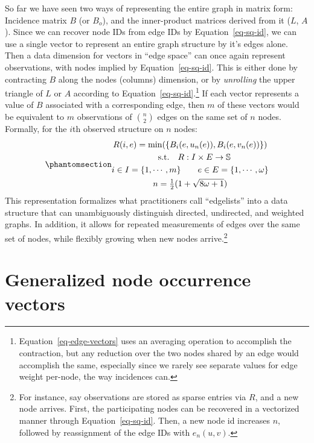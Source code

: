 \documentclass[%
	12pt,
		oneside,
		letterpaper
]{book}
\begin{document}
So far we have seen two ways of representing the entire graph in matrix
form: Incidence matrix \(B\) (or \(B_o\)), and the inner-product
matrices derived from it (\(L\), \(A\)). Since we can recover node IDs
from edge IDs by Equation~\ref{eq-sq-id}, we can use a single vector to
represent an entire graph structure by it's edges alone. Then a data
dimension for vectors in ``edge space'' can once again represent
observations, with nodes implied by Equation~\ref{eq-sq-id}. This is
either done by contracting \(B\) along the nodes (columns) dimension, or
by \emph{unrolling} the upper triangle of \(L\) or \(A\) according to
Equation~\ref{eq-sq-id}.\footnote{ Equation~\ref{eq-edge-vectors} uses
  an averaging operation to accomplish the contraction, but any
  reduction over the two nodes shared by an edge would accomplish the
  same, especially since we rarely see separate values for edge weight
  per-node, the way incidences can.} If each vector represents a value
of \(B\) associated with a corresponding edge, then \(m\) of these
vectors would be equivalent to \(m\) observations of \({n \choose 2}\)
edges on the same set of \(n\) nodes. Formally, for the \(i\)th observed
structure on \(n\) nodes:
\begin{equation}\phantomsection\label{eq-edge-vectors}{
\begin{gathered}
R(i,e) = \min(\{B_i(e, u_n(e)),B_i(e,v_n(e))\}) \\
\quad \textrm{s.t.} \quad R:I\times E \rightarrow \mathbb{S}\\
i\in I = \{1,\cdots,m\} \qquad e \in E=\left\{1,\cdots,\omega\right\}\\
n=\tfrac{1}{2}(1+\sqrt{8\omega+1})
\end{gathered}
}\end{equation} This representation formalizes what practitioners call
``edgelists'' into a data structure that can unambiguously distinguish
directed, undirected, and weighted graphs. In addition, it allows for
repeated measurements of edges over the same set of nodes, while
flexibly growing when new nodes arrive.\footnote{ For instance, say
  observations are stored as sparse entries via \(R\), and a new node
  arrives. First, the participating nodes can be recovered in a
  vectorized manner through Equation~\ref{eq-sq-id}. Then, a new node id
  increases \(n\), followed by reassignment of the edge IDs with
  \(e_n(u,v)\).}

\section{Generalized node occurrence
vectors}\label{generalized-node-occurrence-vectors}
\end{document}
